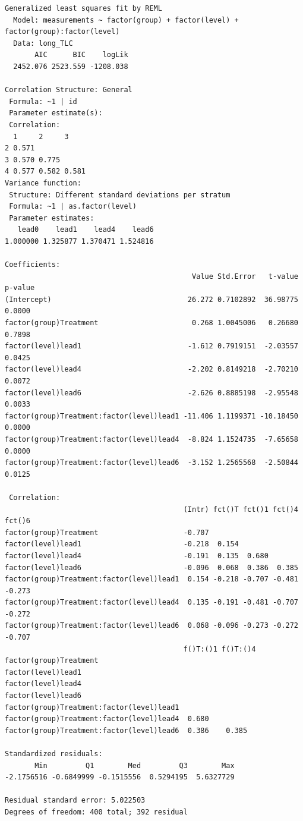 \documentclass[
  letterpaper,
  DIV=11,
  numbers=noendperiod]{scrreprt}
\begin{document}
\begin{verbatim}
Generalized least squares fit by REML
  Model: measurements ~ factor(group) + factor(level) + factor(group):factor(level) 
  Data: long_TLC 
       AIC      BIC    logLik
  2452.076 2523.559 -1208.038

Correlation Structure: General
 Formula: ~1 | id 
 Parameter estimate(s):
 Correlation: 
  1     2     3    
2 0.571            
3 0.570 0.775      
4 0.577 0.582 0.581
Variance function:
 Structure: Different standard deviations per stratum
 Formula: ~1 | as.factor(level) 
 Parameter estimates:
   lead0    lead1    lead4    lead6 
1.000000 1.325877 1.370471 1.524816 

Coefficients:
                                            Value Std.Error   t-value p-value
(Intercept)                                26.272 0.7102892  36.98775  0.0000
factor(group)Treatment                      0.268 1.0045006   0.26680  0.7898
factor(level)lead1                         -1.612 0.7919151  -2.03557  0.0425
factor(level)lead4                         -2.202 0.8149218  -2.70210  0.0072
factor(level)lead6                         -2.626 0.8885198  -2.95548  0.0033
factor(group)Treatment:factor(level)lead1 -11.406 1.1199371 -10.18450  0.0000
factor(group)Treatment:factor(level)lead4  -8.824 1.1524735  -7.65658  0.0000
factor(group)Treatment:factor(level)lead6  -3.152 1.2565568  -2.50844  0.0125

 Correlation: 
                                          (Intr) fct()T fct()1 fct()4 fct()6
factor(group)Treatment                    -0.707                            
factor(level)lead1                        -0.218  0.154                     
factor(level)lead4                        -0.191  0.135  0.680              
factor(level)lead6                        -0.096  0.068  0.386  0.385       
factor(group)Treatment:factor(level)lead1  0.154 -0.218 -0.707 -0.481 -0.273
factor(group)Treatment:factor(level)lead4  0.135 -0.191 -0.481 -0.707 -0.272
factor(group)Treatment:factor(level)lead6  0.068 -0.096 -0.273 -0.272 -0.707
                                          f()T:()1 f()T:()4
factor(group)Treatment                                     
factor(level)lead1                                         
factor(level)lead4                                         
factor(level)lead6                                         
factor(group)Treatment:factor(level)lead1                  
factor(group)Treatment:factor(level)lead4  0.680           
factor(group)Treatment:factor(level)lead6  0.386    0.385  

Standardized residuals:
       Min         Q1        Med         Q3        Max 
-2.1756516 -0.6849999 -0.1515556  0.5294195  5.6327729 

Residual standard error: 5.022503 
Degrees of freedom: 400 total; 392 residual
\end{verbatim}
\end{document}
